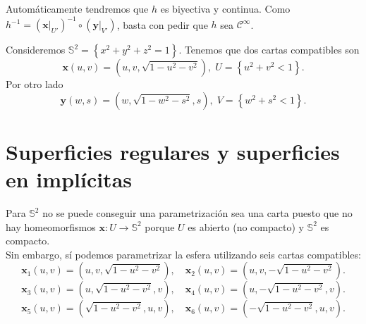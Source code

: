 \begin{observation}
Automáticamente tendremos que $\displaystyle h $ es biyectiva y continua. Como $\displaystyle h^{-1} = \left( \textbf{x} |_{U'}\right)^{-1}\circ \left( \textbf{y} |_{V'}\right) $, basta con pedir que $\displaystyle h $ sea $\displaystyle \mathcal{C}^{\infty} $.  
\end{observation}
\begin{eg}[Esfera]
	Consideremos $\displaystyle \mathbb{S}^{2} = \left\{ x^{2}+y^{2}+z^{2}=1\right\}  $. Tenemos que dos cartas compatibles son
	\[ \textbf{x} \left(u,v\right)=\left(u,v, \sqrt{1-u^{2}-v^{2}}\right), \; U = \left\{ u^{2}+v^{2} < 1\right\}  .\]
Por otro lado
\[ \textbf{y} \left(w,s\right)=\left(w,\sqrt{1-w^{2}-s^{2}}, s\right), \; V = \left\{ w^{2} + s^{2} < 1\right\}  .\]
\end{eg}
\section{Superficies regulares y superficies en implícitas}
\begin{eg}
Para $\displaystyle \mathbb{S}^{2} $ no se puede conseguir una parametrización sea una carta puesto que no hay homeomorfismos $\displaystyle \textbf{x}  : U \to \mathbb{S}^{2} $ porque $\displaystyle U $ es abierto (no compacto) y $\displaystyle \mathbb{S}^{2} $ es compacto. \\
Sin embargo, sí podemos parametrizar la esfera utilizando seis cartas compatibles:
\[ \textbf{x}_{1} \left(u,v\right)=\left(u, v, \sqrt{1-u^{2}-v^{2}}\right),\quad \textbf{x}_{2}  \left(u,v\right)=\left(u,v,-\sqrt{1-u^{2}-v^{2}}\right) .\]
\[ \textbf{x} _{3}\left(u,v\right)=\left(u,\sqrt{1-u^{2}-v^{2}}, v\right), \quad \textbf{x} _{4} \left(u,v\right)=\left(u,-\sqrt{1-u^{2}-v^{2}}, v\right) .\]
\[ \textbf{x}_{5}\left(u,v\right) = \left(\sqrt{1-u^{2}-v^{2}}, u, v\right), \quad \textbf{x} _{6}\left(u,v\right)=\left(-\sqrt{1-u^{2}-v^{2}}, u, v\right).\]
\end{eg}

